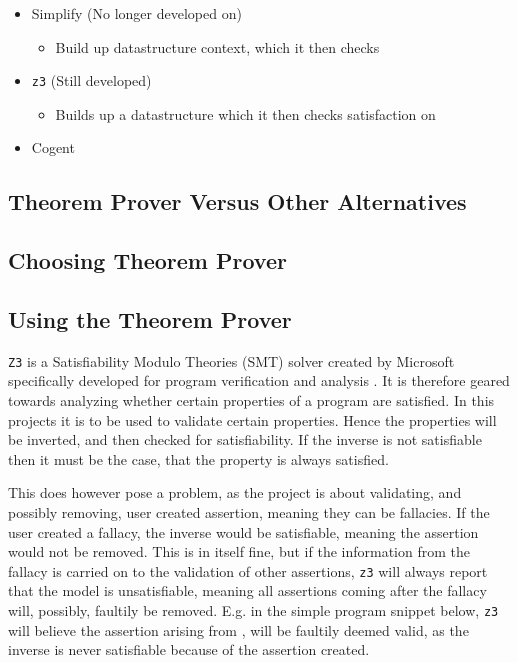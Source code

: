 \begin{itemize}
    \item Simplify (No longer developed on)
        \begin{itemize}
            \item Build up datastructure context, which it then checks
        \end{itemize}
    \item \texttt{z3} (Still developed)
        \begin{itemize}
            \item Builds up a datastructure which it then checks satisfaction on
        \end{itemize}
    \item Cogent
\end{itemize}

\subsection{Theorem Prover Versus Other Alternatives \ms}

\subsection{Choosing Theorem Prover \ms}

\subsection{Using the Theorem Prover \rr}
\texttt{Z3} is a Satisfiability Modulo Theories (SMT) solver created by Microsoft specifically developed
for program verification and analysis \cite{z3:microsoft}. It is therefore geared towards
analyzing whether certain properties of a program are satisfied. In this projects it is to be
used to validate certain properties. Hence the properties will be inverted, and then checked for
satisfiability. If the inverse is not satisfiable then it must be the case, that the property
is always satisfied.

This does however pose a problem, as the project is about validating, and possibly removing,
user created assertion, meaning they can be fallacies. If the user created a fallacy, the inverse
would be satisfiable, meaning the assertion would not be removed. This is in itself fine, but if
the information from the fallacy is carried on to the validation of other assertions, \texttt{z3}
will always report that the model is unsatisfiable, meaning all assertions coming after the fallacy
will, possibly, faultily be removed. E.g. in the simple program snippet below, \texttt{z3} will
believe the assertion arising from , will be faultily deemed valid, as the
inverse is never satisfiable because of the assertion created.

